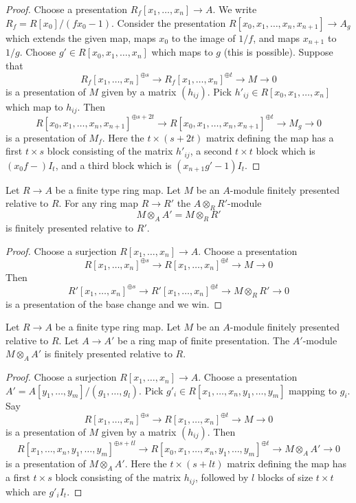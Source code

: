 \begin{proof}
Choose a presentation $R_f[x_1, \ldots, x_n] \to A$. We write
$R_f = R[x_0]/(fx_0 - 1)$. Consider the presentation
$R[x_0, x_1, \ldots, x_n, x_{n + 1}] \to A_g$ which extends the given
map, maps $x_0$ to the image of $1/f$, and maps $x_{n + 1}$ to $1/g$.
Choose $g' \in R[x_0, x_1, \ldots, x_n]$ which maps to $g$ (this is
possible). Suppose that
$$
R_f[x_1, \ldots, x_n]^{\oplus s} \to
R_f[x_1, \ldots, x_n]^{\oplus t} \to M \to 0
$$
is a presentation of $M$ given by a matrix $(h_{ij})$. Pick
$h'_{ij} \in R[x_0, x_1, \ldots, x_n]$ which map to $h_{ij}$.
Then
$$
R[x_0, x_1, \ldots, x_n, x_{n + 1}]^{\oplus s + 2t} \to
R[x_0, x_1, \ldots, x_n, x_{n + 1}]^{\oplus t} \to M_g \to 0
$$
is a presentation of $M_f$.
Here the $t \times (s + 2t)$ matrix defining the map has a first
$t \times s$ block consisting of the matrix $h'_{ij}$, a second
$t \times t$ block which is $(x_0f - )I_t$, and a third block
which is $(x_{n + 1}g' - 1)I_t$.
\end{proof}

\begin{lemma}
\label{lemma-base-change-relative-finite-presentation}
Let $R \to A$ be a finite type ring map. Let $M$ be an $A$-module finitely
presented relative to $R$. For any ring map $R \to R'$ the
$A \otimes_R R'$-module
$$
M \otimes_A A' = M \otimes_R R'
$$
is finitely presented relative to $R'$.
\end{lemma}

\begin{proof}
Choose a surjection $R[x_1, \ldots, x_n] \to A$. Choose a presentation
$$
R[x_1, \ldots, x_n]^{\oplus s} \to
R[x_1, \ldots, x_n]^{\oplus t} \to M \to 0
$$
Then
$$
R'[x_1, \ldots, x_n]^{\oplus s} \to
R'[x_1, \ldots, x_n]^{\oplus t} \to M \otimes_R R' \to 0
$$
is a presentation of the base change and we win.
\end{proof}

\begin{lemma}
\label{lemma-pull-relative-finite-presentation}
Let $R \to A$ be a finite type ring map.
Let $M$ be an $A$-module finitely presented relative to $R$.
Let $A \to A'$ be a ring map of finite presentation.
The $A'$-module $M \otimes_A A'$ is finitely presented relative to $R$.
\end{lemma}

\begin{proof}
Choose a surjection $R[x_1, \ldots, x_n] \to A$. Choose a presentation
$A' = A[y_1, \ldots, y_m]/(g_1, \ldots, g_l)$.
Pick $g'_i \in R[x_1, \ldots, x_n, y_1, \ldots, y_m]$ mapping to $g_i$.
Say
$$
R[x_1, \ldots, x_n]^{\oplus s} \to
R[x_1, \ldots, x_n]^{\oplus t} \to M \to 0
$$
is a presentation of $M$ given by a matrix $(h_{ij})$.
Then
$$
R[x_1, \ldots, x_n, y_1, \ldots, y_m]^{\oplus s + tl} \to
R[x_0, x_1, \ldots, x_n, y_1, \ldots, y_m]^{\oplus t} \to M \otimes_A A' \to 0
$$
is a presentation of $M \otimes_A A'$.
Here the $t \times (s + lt)$ matrix defining the map has a first
$t \times s$ block consisting of the matrix $h_{ij}$, followed
by $l$ blocks of size $t \times t$ which are $g'_iI_t$.
\end{proof}


